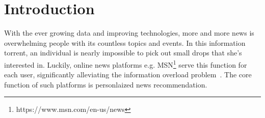 \documentclass[sigconf,anonymous]{acmart}
\begin{document}


\keywords{}

\maketitle

\section{Introduction}
\label{section:introduction}
With the ever growing data and improving technologies, more and more news is overwhelming people with its countless topics and events. In this information torrent, an individual is nearly impossible to pick out small drops that she's interested in. Luckily, online news platforms e.g. MSN\footnote{https://www.msn.com/en-us/news} serve this function for each user, significantly alleviating the information overload problem~\cite{personalized_news_recommendation}. The core function of such platforms is personlaized news recommendation.
\end{document}
